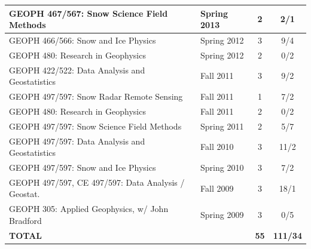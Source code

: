 \documentclass[11pt]{article}
\begin{document}
\begin{table}[!htbp]
\begin{tabular}{|l|l|c|c|}
GEOPH 467/567: Snow Science Field Methods & Spring 2013 & 2 & 2/1 \\ \hline
GEOPH 466/566: Snow and Ice Physics & Spring 2012 & 3 & 9/4 \\ \hline
GEOPH 480: Research in Geophysics & Spring 2012 & 2 & 0/2 \\ \hline
GEOPH 422/522: Data Analysis and Geostatistics & Fall 2011 & 3 & 9/2 \\ \hline
GEOPH 497/597: Snow Radar Remote Sensing & Fall 2011 & 1 & 7/2 \\ \hline
GEOPH 480: Research in Geophysics & Fall 2011 & 2 & 0/2 \\ \hline
GEOPH 497/597: Snow Science Field Methods & Spring 2011 & 2 & 5/7 \\ \hline
GEOPH 497/597: Data Analysis and Geostatistics & Fall 2010 & 3 & 11/2 \\ \hline
GEOPH 497/597: Snow and Ice Physics & Spring 2010 & 3 & 7/2 \\ \hline
GEOPH 497/597, CE 497/597: Data Analysis / Geostat. & Fall 2009 & 3 & 18/1  \\ \hline
GEOPH 305: Applied Geophysics, w/ John Bradford & Spring 2009 & 3 & 0/5 \\ \hline
\textbf{TOTAL} &  & \textbf{55} & \textbf{111/34} \\ \hline
\end{tabular}
\end{table}

\end{document}
